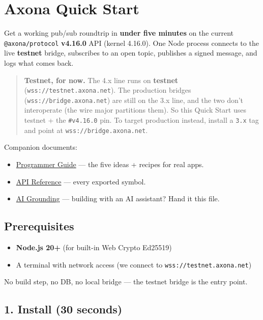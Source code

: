 \documentclass[
  nobib]{tufte-handout}
\author{}
\date{}
\providecommand{\tightlist}{%
  \setlength{\itemsep}{0pt}\setlength{\parskip}{0pt}}
\begin{document}
\section{Axona Quick Start}\label{axona-quick-start}

Get a working pub/sub roundtrip in \textbf{under five minutes} on the
current \texttt{@axona/protocol} \textbf{v4.16.0} API (kernel 4.16.0).
One Node process connects to the live \textbf{testnet} bridge,
subscribes to an open topic, publishes a signed message, and logs what
comes back.

\begin{quote}
\textbf{Testnet, for now.} The 4.x line runs on \textbf{testnet}
(\texttt{wss://testnet.axona.net}). The production bridges
(\texttt{wss://bridge.axona.net}) are still on the 3.x line, and the two
don't interoperate (the wire major partitions them). So this Quick Start
uses testnet + the \texttt{\#v4.16.0} pin. To target production instead,
install a \texttt{3.x} tag and point at \texttt{wss://bridge.axona.net}.
\end{quote}

Companion documents:

\begin{itemize}
\tightlist
\item
  \href{Axona-Programmer-Guide-v4.16.0.md}{Programmer Guide} --- the
  five ideas + recipes for real apps.
\item
  \href{Axona-API-Reference-v4.16.0.md}{API Reference} --- every
  exported symbol.
\item
  \href{Axona-AI-Grounding-v4.16.0.md}{AI Grounding} --- building with
  an AI assistant? Hand it this file.
\end{itemize}

\subsection{Prerequisites}\label{prerequisites}

\begin{itemize}
\tightlist
\item
  \textbf{Node.js 20+} (for built-in Web Crypto Ed25519)
\item
  A terminal with network access (we connect to
  \texttt{wss://testnet.axona.net})
\end{itemize}

No build step, no DB, no local bridge --- the testnet bridge is the
entry point.

\subsection{1. Install (30 seconds)}\label{install-30-seconds}
\end{document}
